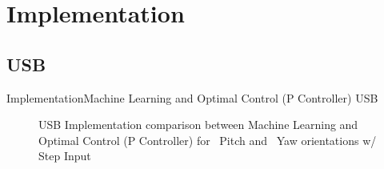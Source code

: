 \documentclass{beamer}
\begin{document}

\section{Implementation}

\subsection{USB}
%
\begin{frame}{Implementation}{Machine Learning and Optimal Control (P Controller) USB}
    \begin{figure}
      \centering
      \caption{USB Implementation comparison between Machine Learning and Optimal Control (P Controller) for ~Pitch and ~Yaw orientations w/ Step Input}
      \label{fig:LQRvADP_USB}
    \end{figure}
\end{frame}
\end{document}
